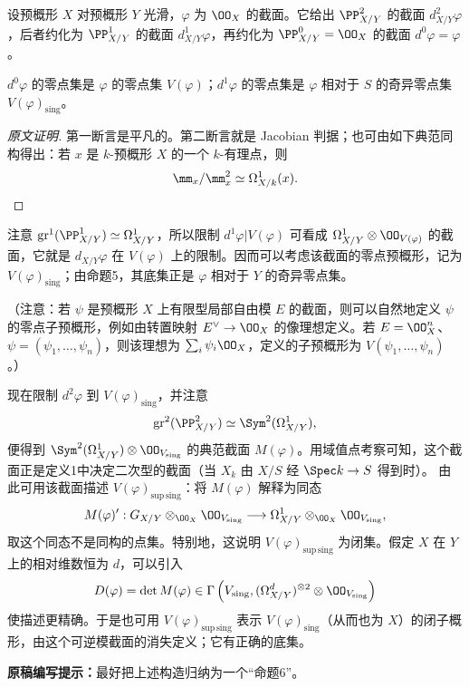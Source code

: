 设预概形 $X$ 对预概形 $Y$ 光滑，$\varphi$ 为 $\OO_X$ 的截面。它给出 $\PP^2_{X/Y}$ 的截面 $d^2_{X/Y}\varphi$，后者约化为 $\PP^1_{X/Y}$ 的截面 $d^1_{X/Y}\varphi$，再约化为 $\PP^0_{X/Y}=\OO_X$ 的截面 $d^0\varphi=\varphi$。

$d^0\varphi$ 的零点集是 $\varphi$ 的零点集 $V(\varphi)$；$d^1\varphi$ 的零点集是 $\varphi$ 相对于 $S$ 的奇异零点集 $V(\varphi)_{\mathrm{sing}}$。
\begin{proof}[原文证明]
第一断言是平凡的。第二断言就是 Jacobian 判据；也可由如下典范同构得出：若 $x$ 是 $k$-预概形 $X$ 的一个 $k$-有理点，则
\[
 \mm_x/\mm_x^2\simeq\Omega^1_{X/k}(x).
\]
\end{proof}
注意 $\operatorname{gr}^1(\PP^1_{X/Y})\simeq\Omega^1_{X/Y}$，所以限制 $d^1\varphi|V(\varphi)$ 可看成 $\Omega^1_{X/Y}\otimes\OO_{V(\varphi)}$ 的截面，它就是 $d_{X/Y}\varphi$ 在 $V(\varphi)$ 上的限制。因而可以考虑该截面的零点预概形，记为 $V(\varphi)_{\mathrm{sing}}$；由命题5，其底集正是 $\varphi$ 相对于 $Y$ 的奇异零点集。

（注意：若 $\psi$ 是预概形 $X$ 上有限型局部自由模 $E$ 的截面，则可以自然地定义 $\psi$ 的零点子预概形，例如由转置映射 $E^\vee\to\OO_X$ 的像理想定义。若 $E=\OO_X^n$、$\psi=(\psi_1,\ldots,\psi_n)$，则该理想为 $\sum_i\psi_i\OO_X$，定义的子预概形为 $V(\psi_1,\ldots,\psi_n)$。）

现在限制 $d^2\varphi$ 到 $V(\varphi)_{\mathrm{sing}}$，并注意
\[
 \operatorname{gr}^2(\PP^2_{X/Y})\simeq\Sym^2(\Omega^1_{X/Y}),
\]
便得到 $\Sym^2(\Omega^1_{X/Y})\otimes\OO_{V_{\mathrm{sing}}}$ 的典范截面 $M(\varphi)$。用域值点考察可知，这个截面正是定义1中决定二次型的截面（当 $X_k$ 由 $X/S$ 经 $\Spec k\to S$ 得到时）。
由此可用该截面描述 $V(\varphi)_{\mathrm{sup\,sing}}$：将 $M(\varphi)$ 解释为同态
\[
 M(\varphi)':G_{X/Y}\otimes_{\OO_X}\OO_{V_{\mathrm{sing}}}
 \longrightarrow\Omega^1_{X/Y}\otimes_{\OO_X}\OO_{V_{\mathrm{sing}}},
\]
取这个同态不是同构的点集。特别地，这说明 $V(\varphi)_{\mathrm{sup\,sing}}$ 为闭集。假定 $X$ 在 $Y$ 上的相对维数恒为 $d$，可以引入
\[
 D(\varphi)=\det M(\varphi)
 \in\Gamma\left(V_{\mathrm{sing}},
       (\Omega^d_{X/Y})^{\otimes2}\otimes\OO_{V_{\mathrm{sing}}}\right)
\]
使描述更精确。于是也可用 $V(\varphi)_{\mathrm{sup\,sing}}$ 表示 $V(\varphi)_{\mathrm{sing}}$（从而也为 $X$）的闭子概形，由这个可逆模截面的消失定义；它有正确的底集。

\noindent\textbf{原稿编写提示：}最好把上述构造归纳为一个“命题6”。

